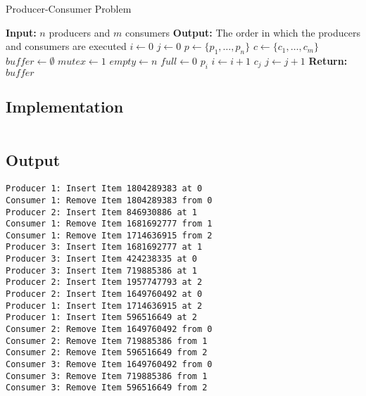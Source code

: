 \begin{algorithm}
    \caption{Producer-Consumer Problem}
    \label{alg:producer_consumer}
    \begin{algorithmic}[1]
        \State \textbf{Input:} $n$ producers and $m$ consumers
        \State \textbf{Output:} The order in which the producers and consumers are executed
        \State $i \gets 0$ 
        \State $j \gets 0$ 
        \State $p \gets \{p_1, \dots, p_n\}$ 
        \State $c \gets \{c_1, \dots, c_m\}$ 
        \State $buffer \gets \emptyset$ 
        \State $mutex \gets 1$ 
        \State $empty \gets n$ 
        \State $full \gets 0$ 
                \State $p_i$ 
                \State $i \gets i + 1$
            \EndIf
                \State $c_j$ 
                \State $j \gets j + 1$
            \EndIf
        \EndWhile
        \State \textbf{Return:} $buffer$
    \end{algorithmic}
\end{algorithm}

\subsection{Implementation}

\inputminted[fontsize=\footnotesize,autogobble]{c}{code/producer_consumer.c}

\subsection{Output}
\begin{lstlisting}[style=output]
Producer 1: Insert Item 1804289383 at 0
Consumer 1: Remove Item 1804289383 from 0
Producer 2: Insert Item 846930886 at 1
Consumer 1: Remove Item 1681692777 from 1
Consumer 1: Remove Item 1714636915 from 2
Producer 3: Insert Item 1681692777 at 1
Producer 3: Insert Item 424238335 at 0
Producer 3: Insert Item 719885386 at 1
Producer 2: Insert Item 1957747793 at 2
Producer 2: Insert Item 1649760492 at 0
Producer 1: Insert Item 1714636915 at 2
Producer 1: Insert Item 596516649 at 2
Consumer 2: Remove Item 1649760492 from 0
Consumer 2: Remove Item 719885386 from 1
Consumer 2: Remove Item 596516649 from 2
Consumer 3: Remove Item 1649760492 from 0
Consumer 3: Remove Item 719885386 from 1
Consumer 3: Remove Item 596516649 from 2
\end{lstlisting}